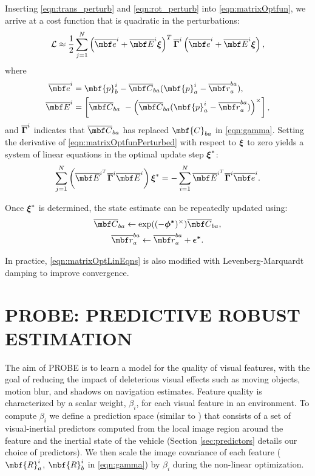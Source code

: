 \documentclass[letterpaper, 10 pt, conference]{ieeeconf}  %
\begin{document}
Inserting \eqref{eqn:trans_perturb} and \eqref{eqn:rot_perturb} into \eqref{eqn:matrixOptfun}, we arrive at a cost function that is quadratic in the perturbations:
\begin{gather}
\label{eqn:matrixOptfunPerturbed}
\mathcal{L} \approx \frac{1}{2} \sum_{j=1}^{N} \left( \mbfbar{e}^i + \mbfbar{E}^i \mbs{\xi} \right)^T \mbsbar{\Gamma}^i \left(  \mbfbar{e}^i + \mbfbar{E}^i \mbs{\xi} \right),
\end{gather}
\noindent where
\begin{align*}
\mbfbar{e}^i &= \mbf{p}_b^i - \mbfbar{C}_{ba}(\mbf{p}_a^i - \mbfbar{r}_a^{ba}), \\  \mbfbar{E}^i &= \left[\mbfbar{C}_{ba} ~ -\left(\mbfbar{C}_{ba}(\mbf{p}_a^i - \mbfbar{r}_a^{ba})\right)^\times \right],
\end{align*}
and $\overline{\boldsymbol{\Gamma}}^i$ indicates that $\mbfbar{C}_{ba}$ has replaced $\mbf{C}_{ba}$ in \eqref{eqn:gamma}.
Setting the derivative of \eqref{eqn:matrixOptfunPerturbed} with respect to $\boldsymbol{\xi}$ to zero yields a system of linear equations in the optimal update step $\boldsymbol{\xi}^*$:
\begin{gather}
\label{eqn:matrixOptLinEqns}
\sum_{j=1}^{N} \left( \mbfbar{E}^{i^T} \mbsbar{\Gamma}^i \mbfbar{E}^i \right) \mbs \xi^* = - \sum_{i=1}^{N} \mbfbar{E}^{i^T} \mbsbar{\Gamma}^i \mbfbar{e}^i.
\end{gather}

\noindent Once $\boldsymbol{\xi}^*$ is determined, the state estimate can be repeatedly updated using:
\begin{gather}
\mbfbar{C}_{ba} \leftarrow \exp((-\mbs{\phi^*})^{\times}) \mbfbar{C}_{ba}, \\
\mbfbar{r}_a^{ba} \leftarrow \mbfbar{r}_a^{ba} + \mbs{\epsilon^*}.
\end{gather}

\noindent In practice, \eqref{eqn:matrixOptLinEqns} is also modified with Levenberg-Marquardt damping to improve convergence.



\section{PROBE: PREDICTIVE ROBUST ESTIMATION} \label{sec:probe}
The aim of PROBE is to learn a model for the quality of visual features, with the goal of reducing the impact of deleterious visual effects such as moving objects, motion blur, and shadows on navigation estimates.
Feature quality is characterized by a scalar weight, $\beta_i$, for each visual feature in an environment.
To compute $\beta_i$ we define a prediction space (similar to \cite{VegaBrown:ew}) that consists of a set of visual-inertial predictors computed from the local image region around the feature and the inertial state of the vehicle (Section \ref{sec:predictors} details our choice of predictors).
We then scale the image covariance of each feature ($\mbf{R}_a^{i}$, $\mbf{R}_b^{i}$ in \eqref{eqn:gamma}) by $\beta_i$ during the non-linear optimization.
\end{document}
